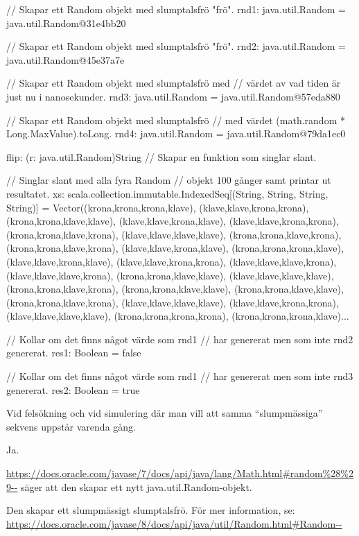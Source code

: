 {\begin{REPL}
  // Skapar ett Random objekt med slumptalsfrö "frö". 
rnd1: java.util.Random = java.util.Random@31e4bb20 

  // Skapar ett Random objekt med slumptalsfrö "frö".
rnd2: java.util.Random = java.util.Random@45e37a7e 

  // Skapar ett Random objekt med slumptalsfrö med 
  // värdet av vad tiden är just nu i nanosekunder.
rnd3: java.util.Random = java.util.Random@57eda880 

  // Skapar ett Random objekt med slumptalsfrö 
  // med värdet (math.random * Long.MaxValue).toLong.
rnd4: java.util.Random = java.util.Random@79da1ec0 

flip: (r: java.util.Random)String // Skapar en funktion som singlar slant.

  // Singlar slant med alla fyra Random 
  // objekt 100 gånger samt printar ut resultatet.
xs: scala.collection.immutable.IndexedSeq[(String, String, String, String)] = 
Vector((krona,krona,krona,klave), (klave,klave,krona,krona), (krona,krona,klave,klave), 
(klave,klave,krona,klave), (klave,klave,krona,krona), (krona,krona,klave,krona), 
(klave,klave,klave,klave), (krona,krona,klave,krona), (krona,krona,klave,krona), 
(klave,klave,krona,klave), (krona,krona,krona,klave), (klave,klave,krona,klave), 
(klave,klave,krona,krona), (klave,klave,klave,krona), (klave,klave,klave,krona), 
(krona,krona,klave,klave), (klave,klave,klave,klave), (krona,krona,klave,krona), 
(krona,krona,klave,klave), (krona,krona,klave,klave), (krona,krona,klave,krona), 
(klave,klave,klave,klave), (klave,klave,krona,krona), (klave,klave,klave,klave), 
(krona,krona,krona,krona), (krona,krona,krona,klave)... 

  // Kollar om det finns något värde som rnd1
  // har genererat men som inte rnd2 genererat.
res1: Boolean = false 

  // Kollar om det finns något värde som rnd1
  // har genererat men som inte rnd3 genererat.
res2: Boolean = true 

\end{REPL}

\Subtask Vid felsökning och vid simulering där man vill att samma “slumpmässiga” sekvens uppstår varenda gång.

\Subtask Ja.

\Subtask \url{https://docs.oracle.com/javase/7/docs/api/java/lang/Math.html#random%28%29--} säger att den skapar ett nytt java.util.Random-objekt.

\Subtask Den skapar ett slumpmässigt slumptalsfrö. För mer information, se: \url{https://docs.oracle.com/javase/8/docs/api/java/util/Random.html#Random--}


}
